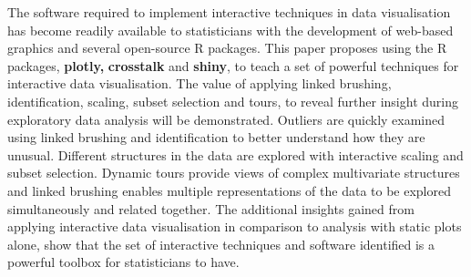 \documentclass[11pt]{book}
\begin{document}


The software required to implement interactive techniques in data visualisation has become readily available to statisticians with the development of web-based graphics and several open-source R packages. This paper proposes using the R packages, \textbf{plotly,} \textbf{crosstalk} and \textbf{shiny}, to teach a set of powerful techniques for interactive data visualisation. The value of applying linked brushing, identification, scaling, subset selection and tours, to reveal further insight during exploratory data analysis will be demonstrated. Outliers are quickly examined using linked brushing and identification to better understand how they are unusual. Different structures in the data are explored with interactive scaling and subset selection. Dynamic tours provide views of complex multivariate structures and linked brushing enables multiple representations of the data to be explored simultaneously and related together. The additional insights gained from applying interactive data visualisation in comparison to analysis with static plots alone, show that the set of interactive techniques and software identified is a powerful toolbox for statisticians to have.

\end{document}
